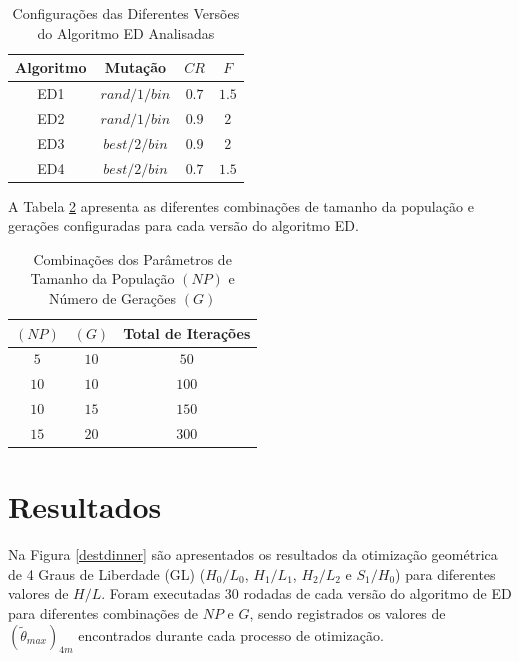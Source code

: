 \documentclass[12pt,A4,A4pt]{article}
\begin{document}
\begin{table}[htbp]
\small
\centering
\caption{\small Configurações das Diferentes Versões do Algoritmo ED Analisadas}
\begin{tabular}{cccc}
\hline
Algoritmo & Mutação & $CR$ & $F$ \\
\hline
ED1 & $rand/1/bin$ & $0.7$ & $1.5$  \\
ED2 & $rand/1/bin$ & $0.9$ & $2$  \\
ED3 & $best/2/bin$ & $0.9$ & $2$  \\
ED4 & $best/2/bin$ & $0.7$ & $1.5$  \\
\hline
\end{tabular}
  \label{tab:algos}
\end{table}

A Tabela \ref{tab:popgeracao} apresenta as diferentes combinações de tamanho da população e gerações configuradas para cada versão do algoritmo ED.

\begin{table}[htbp]
\small
\centering
\caption{\small Combinações dos Parâmetros de Tamanho da População $(NP)$ e Número de Gerações $(G)$}
\begin{tabular}{ccc}
\hline
$(NP)$ & $(G)$ & Total de Iterações \\
\hline
$5$ & $10$ & $50$	\\
$10$ & $10$ & $100$	\\
$10$ & $15$ & $150$	\\
$15$ & $20$ & $300$	\\
\hline
\end{tabular}
  \label{tab:popgeracao}
\end{table}

\section{Resultados}
\label{opt}
\hspace{0.5cm}Na Figura \ref{destdinner} são apresentados os resultados da otimização geométrica de 4 Graus de Liberdade (GL) ($H_{0}/L_{0}$, $H_{1}/L_{1}$, $H_{2}/L_{2}$ e $S_{1}/H_{0}$) para diferentes valores de $H/L$. Foram executadas 30 rodadas de cada versão do algoritmo de ED para diferentes combinações de $NP$ e $G$, sendo registrados os valores de $({\tilde{\theta}}_{max})_{4m}$ encontrados durante cada processo de otimização. 
\end{document}
